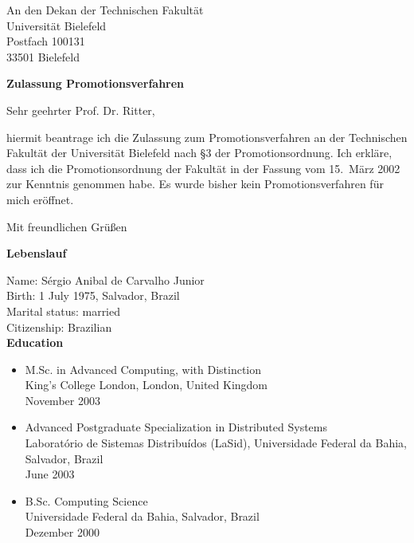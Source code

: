 \documentclass[a4paper,11pt]{letter}
\begin{document}
\begin{letter}{
  An den Dekan der Technischen Fakult\"at\\
  Universit\"at Bielefeld\\
  Postfach 100131\\
  33501 Bielefeld
}

\opening{ {\bf Zulassung Promotionsverfahren}}

Sehr geehrter Prof. Dr. Ritter,

hiermit beantrage ich die Zulassung zum Promotionsverfahren an der Technischen
Fakult\"at der Universit\"at Bielefeld nach \S3 der Promotionsordnung. Ich
erkl\"are, dass ich die Promotionsordnung der Fakult\"at in der Fassung vom 15.\ 
M\"arz 2002 zur Kenntnis genommen habe. Es wurde bisher kein Promotionsverfahren
f\"ur mich er\"offnet.

\closing{Mit freundlichen Gr\"u{\ss}en}


\newpage
{\bf\large Lebenslauf}

Name: S\'ergio Anibal de Carvalho Junior\\
Birth: 1 July 1975, Salvador, Brazil\\
Marital status: married\\
Citizenship: Brazilian\\

{\bf Education}
\begin{itemize}

\item M.Sc. in Advanced Computing, with Distinction\\
      King's College London, London, United Kingdom\\
      November 2003

\item Advanced Postgraduate Specialization in Distributed Systems\\
      Laborat\'orio de Sistemas Distribu\'idos (LaSid), Universidade Federal da
      Bahia, Salvador, Brazil\\
      June 2003

\item B.Sc. Computing Science\\
      Universidade Federal da Bahia, Salvador, Brazil\\
      Dezember 2000


\end{itemize}
\end{letter}
\end{document}
